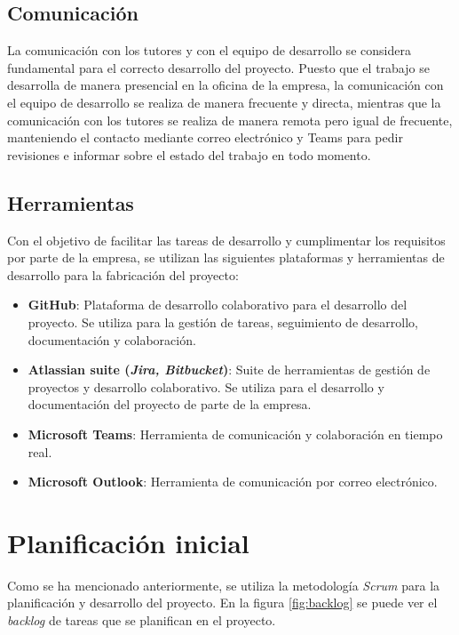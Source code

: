 \subsection{Comunicación}\label{subsec:comunicación}
La comunicación con los tutores y con el equipo de desarrollo se considera
fundamental para el correcto desarrollo del proyecto. Puesto que el trabajo se
desarrolla de manera presencial en la oficina de la empresa, la comunicación con
el equipo de desarrollo se realiza de manera frecuente y directa, mientras que
la comunicación con los tutores se realiza de manera remota pero igual de
frecuente, manteniendo el contacto mediante correo electrónico y Teams para
pedir revisiones e informar sobre el estado del trabajo en todo momento.

\subsection{Herramientas}\label{subsec:herr_planif}
Con el objetivo de facilitar las tareas de desarrollo y cumplimentar los
requisitos por parte de la empresa, se utilizan las siguientes plataformas y
herramientas de desarrollo para la fabricación del proyecto:

\begin{itemize}
	\item \textbf{GitHub}: Plataforma de desarrollo colaborativo para el
		desarrollo del proyecto. Se utiliza para la gestión de tareas,
		seguimiento de desarrollo, documentación y colaboración.
	\item \textbf{Atlassian suite (\emph{Jira, Bitbucket})}: Suite de
		herramientas de gestión de proyectos y desarrollo colaborativo. Se
		utiliza para el desarrollo y documentación del proyecto de parte de la
		empresa.
	\item \textbf{Microsoft Teams}: Herramienta de comunicación y colaboración
		en tiempo real.
	\item \textbf{Microsoft Outlook}: Herramienta de comunicación por correo
		electrónico.
\end{itemize}

\newpage{}
\section{Planificación inicial}\label{sec:planif_inicial}
Como se ha mencionado anteriormente, se utiliza la metodología \textit{Scrum}
para la planificación y desarrollo del proyecto. En la figura \ref{fig:backlog}
se puede ver el \textit{backlog} de tareas que se planifican en el proyecto.

